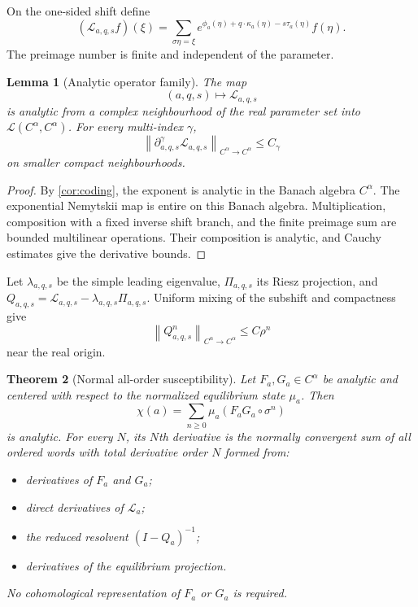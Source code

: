 \documentclass[11pt,reqno]{amsart}
\newtheorem{theorem}{Theorem}[section]
\newtheorem{lemma}[theorem]{Lemma}
\theoremstyle{definition}
\theoremstyle{remark}
\newcommand{\Lop}{\mathscr L}
\newcommand{\norm}[1]{\left\lVert#1\right\rVert}
\begin{document}
On the one-sided shift define
\[
 (\Lop_{a,q,s}f)(\xi)=
 \sum_{\sigma\eta=\xi}
 e^{\phi_a(\eta)+q\cdot\kappa_a(\eta)-s\tau_a(\eta)}f(\eta).
\]
The preimage number is finite and independent of the parameter.

\begin{lemma}[Analytic operator family]\label{lem:analytic-operator}
The map
\[
 (a,q,s)\longmapsto\Lop_{a,q,s}
\]
is analytic from a complex neighbourhood of the real parameter set into
$\mathcal L(C^\alpha,C^\alpha)$.  For every multi-index $\gamma$,
\[
 \norm{\partial_{a,q,s}^\gamma\Lop_{a,q,s}}_{C^\alpha\to C^\alpha}
 \le C_\gamma
\]
on smaller compact neighbourhoods.
\end{lemma}

\begin{proof}
By \cref{cor:coding}, the exponent is analytic in the Banach algebra
$C^\alpha$.  The exponential Nemytskii map is entire on this Banach algebra.
Multiplication, composition with a fixed inverse shift branch, and the finite
preimage sum are bounded multilinear operations.  Their composition is
analytic, and Cauchy estimates give the derivative bounds.
\end{proof}

Let $\lambda_{a,q,s}$ be the simple leading eigenvalue, $\Pi_{a,q,s}$ its
Riesz projection, and $Q_{a,q,s}=\Lop_{a,q,s}-\lambda_{a,q,s}\Pi_{a,q,s}$.
Uniform mixing of the subshift and compactness give
\[
 \norm{Q_{a,q,s}^n}_{C^\alpha\to C^\alpha}\le C\rho^n
\]
near the real origin.

\begin{theorem}[Normal all-order susceptibility]\label{thm:normal-susceptibility}
Let $F_a,G_a\in C^\alpha$ be analytic and centered with respect to the
normalized equilibrium state $\mu_a$.  Then
\[
 \chi(a)=\sum_{n\ge0}\mu_a(F_aG_a\circ\sigma^n)
\]
is analytic.  For every $N$, its $N$th derivative is the normally convergent
sum of all ordered words with total derivative order $N$ formed from:

\begin{itemize}
\item derivatives of $F_a$ and $G_a$;
\item direct derivatives of $\Lop_a$;
\item the reduced resolvent $(I-Q_a)^{-1}$;
\item derivatives of the equilibrium projection.
\end{itemize}

No cohomological representation of $F_a$ or $G_a$ is required.
\end{theorem}
\end{document}
